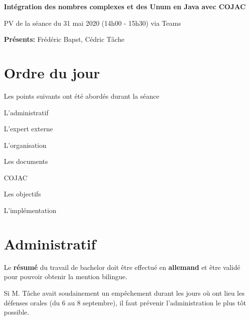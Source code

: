 \documentclass[11pt]{meetingmins}
\date{31 mai 2021}
\begin{document}
\begin {center} {
    \large \textbf {Intégration des nombres complexes et des Unum en Java avec COJAC}
}
\vspace {0.5ex}

PV de la séance du 31 mai 2020 (14h00 - 15h30) via Teams
\end {center} \vspace {1.5em}

\noindent
\textbf{Présents:} Frédéric Bapst, Cédric Tâche

\section{Ordre du jour}
Les points suivants ont été abordés durant la séance
\begin{hiddenitems}
    \item L'administratif
    \item L'expert externe
    \item L'organisation
    \item Les documents
    \item COJAC
    \item Les objectifs
    \item L'implémentation
\end{hiddenitems}

\section{Administratif}
\begin{hiddenitems}
    \item Le \textbf{résumé} du travail de bachelor doit être effectué en \textbf{allemand} et être validé pour pouvoir obtenir la mention bilingue.
    \item Si M. Tâche avait soudainement un empêchement durant les jours où ont lieu les défenses orales (du 6 au 8 septembre), il faut prévenir l'administration le plus tôt possible.
\end{hiddenitems}
\end{document}

